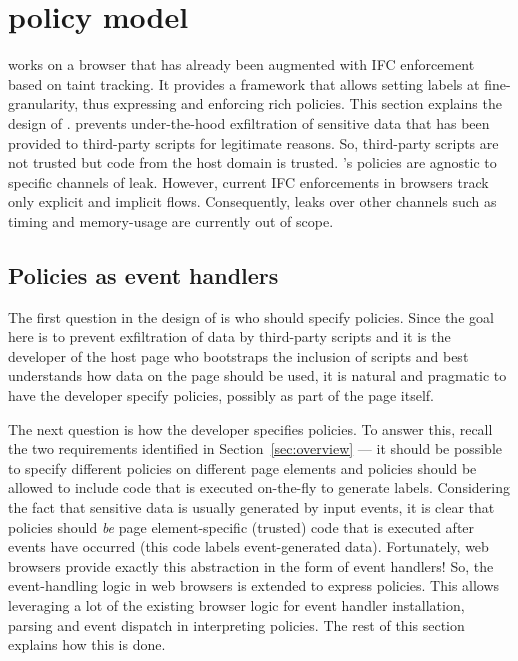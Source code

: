 \lstset{language=HTML}

\section{{\sys} policy model}
\label{sec:model}
{\sys} works on a browser that has already been augmented with IFC
enforcement based on taint tracking.
It provides a framework that allows setting labels at
fine-granularity, thus expressing and enforcing rich policies. This
section explains the design of {\sys}. {\sys} prevents under-the-hood
exfiltration of sensitive data that has been provided to third-party
scripts for legitimate reasons. So, third-party scripts are not
trusted but code from the host domain is trusted.
{\sys}'s policies are agnostic to specific channels of leak.  However, 
current IFC enforcements in browsers track only explicit and implicit 
flows. Consequently, leaks over other channels such as timing and
memory-usage are currently out of scope. 

\subsection{Policies as event handlers}

The first question in the design of {\sys} is who should specify
policies. Since the goal here is to prevent exfiltration of data by
third-party scripts and it is the developer of the host page who
bootstraps the inclusion of scripts and best understands how data on
the page should be used, it is natural and pragmatic to have the
developer specify policies, possibly as part of the page itself.

The next question is how the developer specifies policies. To answer
this, recall the two requirements identified in
Section~\ref{sec:overview} --- it should be possible to specify
different policies on different page elements and policies should be
allowed to include code that is executed on-the-fly to generate
labels. Considering the fact that sensitive data is usually
generated by input events, it is clear that policies should \emph{be}
page element-specific (trusted) code that is executed after events
have occurred (this code labels event-generated data). Fortunately,
web browsers provide exactly this abstraction in the form of event
handlers! So, the event-handling logic in web browsers is extended to
express {\sys} policies. This allows leveraging a lot of the existing
browser logic for event handler installation, parsing and event
dispatch in interpreting policies. The rest of this section explains
how this is done. 

